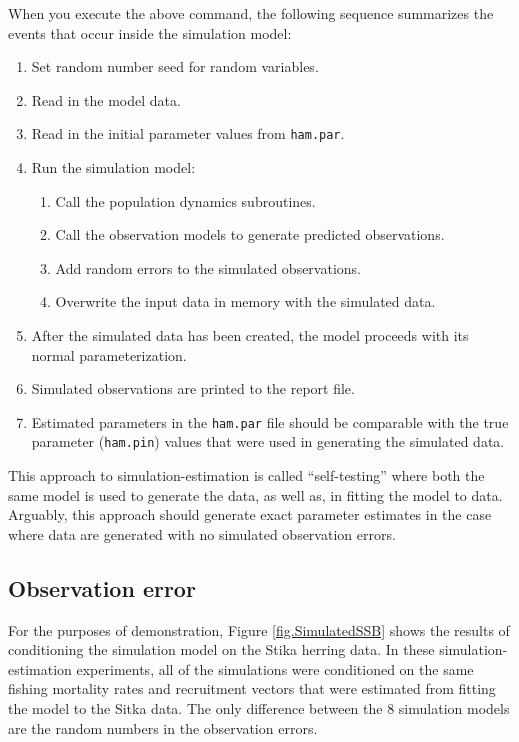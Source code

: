 \documentclass[12pt,letterpaper]{article}
\begin{document}
  When you execute the above command, the following sequence summarizes the events that occur inside the simulation model:
  \begin{enumerate}
    \item Set random number seed for random variables.
    \item Read in the model data.
    \item Read in the initial parameter values from \texttt{ham.par}.
      \item Run the simulation model:
    \begin{enumerate}
    \item Call the population dynamics subroutines.
    \item Call the observation models to generate predicted observations.
    \item Add random errors to the simulated observations.
    \item Overwrite the input data in memory with the simulated data.
    \end{enumerate}
    \item After the simulated data has been created, the model proceeds with its normal parameterization.
    \item Simulated observations are printed to the report file. 
    \item Estimated parameters in the \texttt{ham.par} file should be comparable with the true parameter (\texttt{ham.pin}) values that were used in generating the simulated data.
  \end{enumerate}

  This approach to simulation-estimation is called ``self-testing'' where both the same model is used to generate the data, as well as, in fitting the model to data. Arguably, this approach should generate exact parameter estimates in the case where data are generated with no simulated observation errors.

  \subsection{Observation error} %
  \label{sub:observation_error_only_simulations}
  
   For the purposes of demonstration, Figure \ref{fig.SimulatedSSB} shows the results of conditioning the simulation model on the Stika herring data. In these simulation-estimation experiments, all of the simulations were conditioned on the same fishing mortality rates and recruitment vectors that were estimated from fitting the model to the Sitka data. The only difference between the 8 simulation models are the random numbers in the observation errors.  
\end{document}
